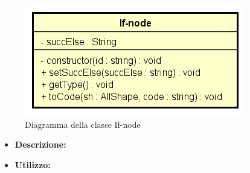 \begin{figure}[h!]
	\centering
	\includegraphics[scale=0.8]{res/sections/SpecificaFrontEnd/Services/Disegnetti/if-node.png}
	\caption{Diagramma della classe If-node}
\end{figure}

\begin{itemize}
	\item \textbf{Descrizione:}\\
	
	\item \textbf{Utilizzo:}\\
	

\end{itemize}
